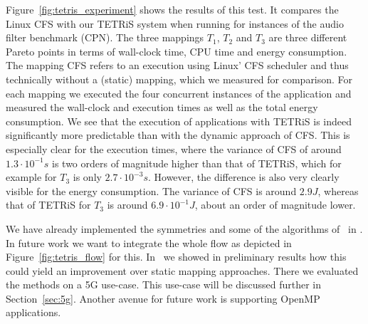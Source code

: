 Figure~\ref{fig:tetris_experiment} shows the results of this test.
It compares the Linux \ac{CFS} with our \ac{TETRiS} system when running for instances of the audio filter benchmark (\ac{CPN}).
The three mappings $T_1$, $T_2$ and $T_3$ are three different Pareto points in terms of wall-clock time, CPU time and energy consumption. 
The mapping \ac{CFS} refers to an execution using Linux' \ac{CFS} scheduler and thus technically without a (static) mapping, which we measured for comparison.
For each mapping we executed the four concurrent instances of the application and measured the wall-clock and execution times as well as the total energy consumption.
We see that the execution of applications with \ac{TETRiS} is indeed significantly more predictable than with the dynamic approach of \ac{CFS}.
This is especially clear for the execution times, where the variance of \ac{CFS} of around $1.3 \cdot 10^{-1} s$ is two orders of magnitude higher than that of \ac{TETRiS}, which for example for $T_3$ is only  $2.7 \cdot 10^{-3}s$.
However, the difference is also very clearly visible for the energy consumption. The variance of \ac{CFS} is around $2.9 J$, whereas that of \ac{TETRiS} for $T_3$ is around $6.9 \cdot 10^{-1} J$, about an order of magnitude lower.

We have already implemented the symmetries and some of the algorithms of~\cite{khasanov_date20} in \mocasin.
 In future work we want to integrate the whole flow as depicted in Figure~\ref{fig:tetris_flow} for this.
In~\cite{menard_rapido21} we showed in preliminary results how this could yield an improvement over static mapping approaches.
There we evaluated the methods on a 5G use-case. This use-case will be discussed further in Section~\ref{sec:5g}.
Another avenue for future work is supporting OpenMP applications.
